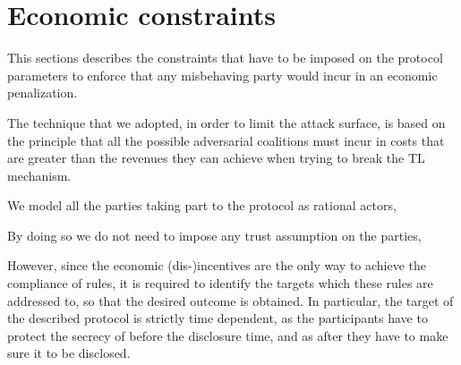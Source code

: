 \section{Economic constraints}\label{sect:constraints}

This sections describes the constraints that have to be imposed on the protocol parameters to enforce that any misbehaving party would incur in an economic penalization.

The technique that we adopted, in order to limit the attack surface, is based on the principle that all the possible adversarial coalitions must incur in costs that are greater than the revenues they can achieve when trying to break the TL mechanism.

We model all the parties taking part to the protocol as rational actors,

By doing so we do not need to impose any trust assumption on the parties, 

However, since the economic (dis-)incentives are the only way to achieve the compliance of rules, it is required to identify the targets which these rules are addressed to, so that the desired outcome is obtained. In particular, the target of the described protocol is strictly time dependent, as the participants have to protect the secrecy of \secret before the disclosure time, and as after \td they have to make sure it to be disclosed.


